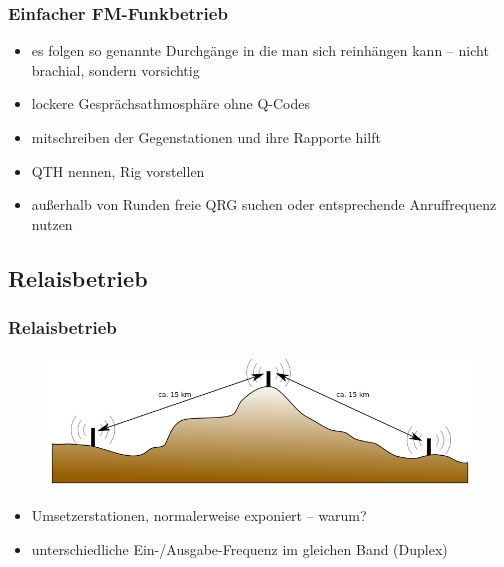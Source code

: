 \begin{frame}
  \frametitle{Einfacher FM-Funkbetrieb}

  \begin{itemize}
    \item es folgen so genannte Durchgänge in die man sich reinhängen kann --
      nicht brachial, sondern vorsichtig
    \item lockere Gesprächsathmosphäre ohne Q-Codes
    \item mitschreiben der Gegenstationen und ihre Rapporte hilft
    \item QTH nennen, Rig vorstellen
    \item außerhalb von Runden freie QRG suchen oder entsprechende
      Anruffrequenz nutzen
  \end{itemize}

\end{frame}

\subsection{Relaisbetrieb}

\begin{frame}
  \frametitle{Relaisbetrieb}

  \begin{center}
    \begin{figure}
      \includegraphics[width=1\textwidth,height=.6\textheight,keepaspectratio]{bv11/Relaisstelle.png}
    \end{figure}
  \end{center}

  \begin{itemize}
    \item Umsetzerstationen, normalerweise exponiert -- warum?
    \item unterschiedliche Ein-/Ausgabe-Frequenz im gleichen Band (Duplex)
  \end{itemize}

\end{frame}

